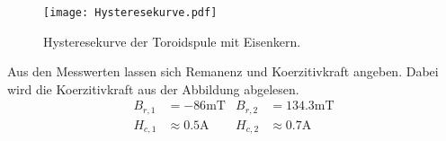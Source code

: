 \begin{figure}
  \centering
  \texttt{[image: Hysteresekurve.pdf]}
  \caption{Hysteresekurve der Toroidspule mit Eisenkern.}
  \label{fig:Hysteresekurve_gemessen}
\end{figure}

Aus den Messwerten lassen sich Remanenz und Koerzitivkraft angeben.
Dabei wird die Koerzitivkraft aus der Abbildung abgelesen.
\begin{align*}
  B_{r,1} &= -86 \unit{\milli\tesla} &  B_{r,2} &= 134.3 \unit{\milli\tesla} \\
  H_{c,1} &\approx 0.5 \unit{\ampere} & H_{c,2} &\approx 0.7\unit{\ampere}
\end{align*}